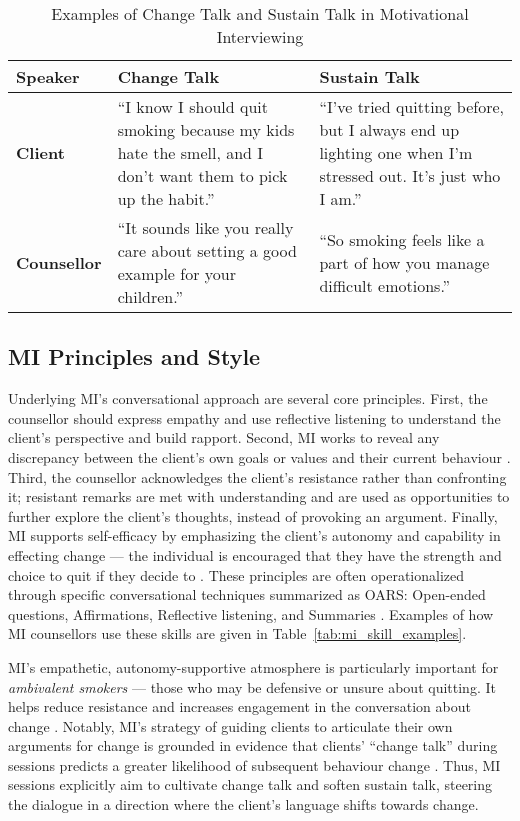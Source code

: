 \begin{table}[ht!]
\centering
\begin{tabular}{@{} p{} p{} p{} @{}}
\toprule
\textbf{Speaker} & \textbf{Change Talk} & \textbf{Sustain Talk} \\
\midrule
\textbf{Client} & 
``I know I should quit smoking because my kids hate the smell, and I don’t want them to pick up the habit.'' & 
``I’ve tried quitting before, but I always end up lighting one when I’m stressed out. It’s just who I am.'' \\
\addlinespace
\textbf{Counsellor} & 
``It sounds like you really care about setting a good example for your children.'' & 
``So smoking feels like a part of how you manage difficult emotions.'' \\
\bottomrule
\end{tabular}
\caption{Examples of Change Talk and Sustain Talk in Motivational Interviewing}
\label{tab:change_sustain_talk}
\end{table}



\subsection{MI Principles and Style}
Underlying MI's conversational approach are several core principles. First, the counsellor should express empathy and use reflective listening to understand the client's perspective and build rapport. Second, MI works to reveal any discrepancy between the client's own goals or values and their current behaviour \cite{MillerRollnick2013}. Third, the counsellor acknowledges the client's resistance rather than confronting it; resistant remarks are met with understanding and are used as opportunities to further explore the client's thoughts, instead of provoking an argument. Finally, MI supports self-efficacy by emphasizing the client's autonomy and capability in effecting change --- the individual is encouraged that they have the strength and choice to quit if they decide to \cite{MillerRollnick2013}. These principles are often operationalized through specific conversational techniques summarized as OARS: Open-ended questions, Affirmations, Reflective listening, and Summaries \cite{Rollnick1995}.  Examples of how MI counsellors use these skills are given in Table~\ref{tab:mi_skill_examples}.


MI's empathetic, autonomy-supportive atmosphere is particularly important for \emph{ambivalent smokers} --- those who may be defensive or unsure about quitting. It helps reduce resistance and increases engagement in the conversation about change \cite{Rollnick1997, MillerRollnick2023}. Notably, MI's strategy of guiding clients to articulate their own arguments for change is grounded in evidence that clients' ``change talk'' during sessions predicts a greater likelihood of subsequent behaviour change \cite{MillerRose2009}. Thus, MI sessions explicitly aim to cultivate change talk and soften sustain talk, steering the dialogue in a direction where the client's language shifts towards change.



